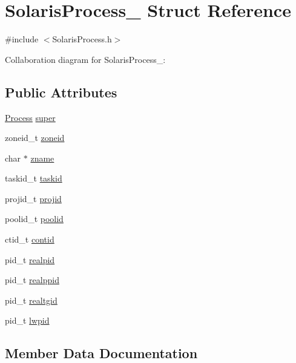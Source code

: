 \hypertarget{structSolarisProcess__}{}\section{Solaris\+Process\+\_\+ Struct Reference}
\label{structSolarisProcess__}


{\ttfamily \#include $<$Solaris\+Process.\+h$>$}



Collaboration diagram for Solaris\+Process\+\_\+\+:
\subsection*{Public Attributes}
\begin{DoxyCompactItemize}
\item 
\hyperlink{Process_8h_a20673e8fa40981a168bf0e196c4cef3b}{Process} \hyperlink{structSolarisProcess___ad70aef6a9e5d45751de7045bdf43d833}{super}
\item 
zoneid\+\_\+t \hyperlink{structSolarisProcess___ae723b7dd252366e19354c0782a288e34}{zoneid}
\item 
char $\ast$ \hyperlink{structSolarisProcess___a97358cf24c88f7c97d21bfc610cbaa64}{zname}
\item 
taskid\+\_\+t \hyperlink{structSolarisProcess___a8600ae79a099e7bfdb0948684bff525e}{taskid}
\item 
projid\+\_\+t \hyperlink{structSolarisProcess___aec8fe2bc68a014c84899dca5400b8940}{projid}
\item 
poolid\+\_\+t \hyperlink{structSolarisProcess___ad329339c24403d597247252ea4b43381}{poolid}
\item 
ctid\+\_\+t \hyperlink{structSolarisProcess___abe144985d4927640370dc7131a7def6b}{contid}
\item 
pid\+\_\+t \hyperlink{structSolarisProcess___a9e74b94029c5a4b46533aeedfd7457bd}{realpid}
\item 
pid\+\_\+t \hyperlink{structSolarisProcess___afbf94ecd987cc6aaa19b62ba25ca4b4c}{realppid}
\item 
pid\+\_\+t \hyperlink{structSolarisProcess___a175e772e282094e540528a7b84f97038}{realtgid}
\item 
pid\+\_\+t \hyperlink{structSolarisProcess___a9c2602b0cffa64610f394f353ef61194}{lwpid}
\end{DoxyCompactItemize}


\subsection{Member Data Documentation}
\mbox{\label{structSolarisProcess___abe144985d4927640370dc7131a7def6b}} 
